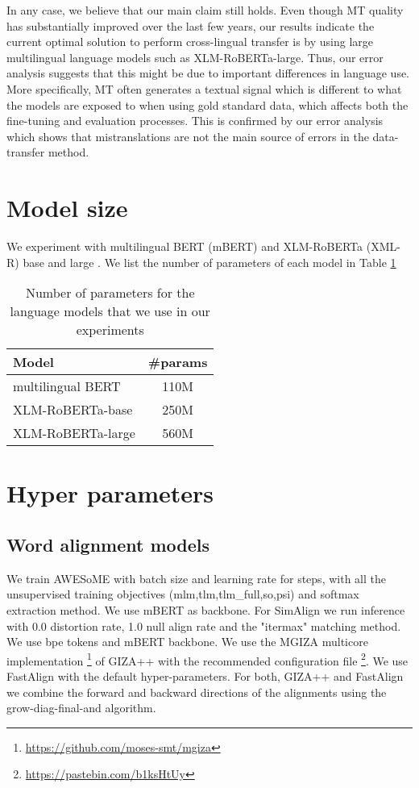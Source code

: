 \documentclass[11pt]{article}
\begin{document}
In any case, we believe that our main claim still holds. Even though MT quality has substantially improved over the last few years, our results indicate the current optimal solution to perform cross-lingual transfer is by using large multilingual language models such as XLM-RoBERTa-large. Thus, our error analysis suggests that this might be due to important differences in language use. More specifically, MT often generates a textual signal which is different to what the models are exposed to when using gold standard data, which affects both the fine-tuning and evaluation processes. This is confirmed by our error analysis which shows that mistranslations are not the main source of errors in the data-transfer method.






\appendix
\label{apen:Apendix}

\section{Model size}\label{apen:ModelSize}
We experiment with multilingual BERT (mBERT) \cite{DBLP:conf/naacl/DevlinCLT19} and XLM-RoBERTa (XML-R) base and large \cite{xlmr}. We list the number of parameters of each model in Table \ref{tab:ParamNo}
\begin{table}[htbp]
    \centering
\begin{tabular}{l|c}
Model & \#params \\
\hline 
multilingual BERT & 110M \\
XLM-RoBERTa-base & 250M \\
XLM-RoBERTa-large & 560M \\
\end{tabular}
    \caption{Number of parameters for the language models that we use in our experiments}
    \label{tab:ParamNo}
\end{table}

\section{Hyper parameters}\label{sec:appendix-hyper}

\subsection{Word alignment models}
We train AWESoME with  batch size and  learning rate for  steps, with all the unsupervised training objectives (mlm,tlm,tlm\_full,so,psi) and softmax extraction method. We use mBERT as backbone. 
For SimAlign we run inference with 0.0 distortion rate, 1.0 null align rate and the "itermax" matching method. We use bpe tokens and mBERT backbone. 
We use the MGIZA multicore implementation \footnote{\url{https://github.com/moses-smt/mgiza}} of GIZA++ with the recommended configuration file \footnote{\url{https://pastebin.com/b1ksHtUy}}. We use FastAlign with the default hyper-parameters. For both, GIZA++ and FastAlign we combine the forward and backward directions of the alignments using the grow-diag-final-and algorithm.
\end{document}
